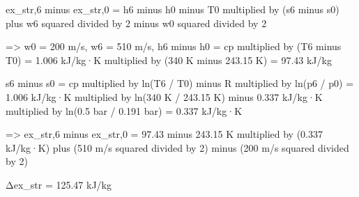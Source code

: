 ex_str,6 minus ex_str,0 = h6 minus h0 minus T0 multiplied by (s6 minus s0) plus w6 squared divided by 2 minus w0 squared divided by 2  

=> w0 = 200 m/s, w6 = 510 m/s, h6 minus h0 = cp multiplied by (T6 minus T0) = 1.006 kJ/kg·K multiplied by (340 K minus 243.15 K) = 97.43 kJ/kg  

s6 minus s0 = cp multiplied by ln(T6 / T0) minus R multiplied by ln(p6 / p0) = 1.006 kJ/kg·K multiplied by ln(340 K / 243.15 K) minus 0.337 kJ/kg·K multiplied by ln(0.5 bar / 0.191 bar) = 0.337 kJ/kg·K  

=> ex_str,6 minus ex_str,0 = 97.43 minus 243.15 K multiplied by (0.337 kJ/kg·K) plus (510 m/s squared divided by 2) minus (200 m/s squared divided by 2)  

Δex_str = 125.47 kJ/kg
